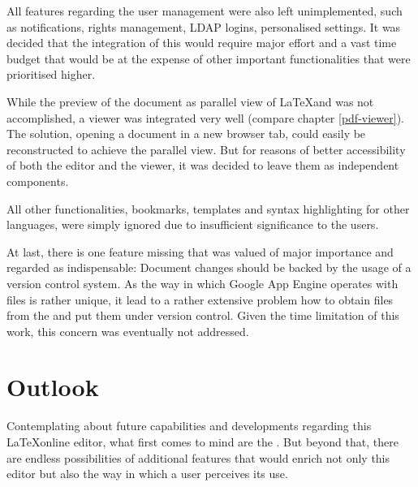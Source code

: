 All features regarding the user management were also left unimplemented, such as notifications, rights management, LDAP logins, personalised settings. It was decided that the integration of this would require major effort and a vast time budget that would be at the expense of other important functionalities that were prioritised higher.

While the preview of the document as parallel view of \LaTeX and  was not accomplished, a  viewer was integrated very well (compare chapter \ref{pdf-viewer}). The solution, opening a document in a new browser tab, could easily be reconstructed to achieve the parallel view. But for reasons of better accessibility of both the editor and the viewer, it was decided to leave them as independent components.

All other functionalities, bookmarks, templates and syntax highlighting for other languages, were simply ignored due to insufficient significance to the users.

At last, there is one feature missing that was valued of major importance and regarded as indispensable: Document changes should be backed by the usage of a version control system. As the way in which Google App Engine operates with files is rather unique, it lead to a rather extensive problem how to obtain files from the  and put them under version control. Given the time limitation of this work, this concern was eventually not addressed.

\section{Outlook}
\label{sec:outlook}
Contemplating about future capabilities and developments regarding this \LaTeX online editor, what first comes to mind are the . But beyond that, there are endless possibilities of additional features that would enrich not only this editor but also the way in which a user perceives its use.

